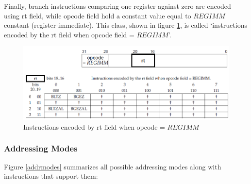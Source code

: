 \documentclass[oneside]{book}
\begin{document}
Finally, branch instructions comparing one register against zero are
encoded using rt field, while opcode field hold a constant value
equal to $REGIMM$ constant (register-immediate).
This class, shown in figure \ref{encoding3}, is called `instructions
encoded by the rt field when opcode field = $REGIMM$'.\\

\begin{figure}[H]
\begin{center}
\includegraphics[width=\textwidth]{encoding3.png}
\end{center}
\caption{Instructions encoded by rt field when opcode = $REGIMM$}
\label{encoding3}
\end{figure}

\subsubsection{Addressing Modes}

Figure \ref{addrmodes} summarizes all possible addressing modes
along with instructions that support them:
\end{document}
